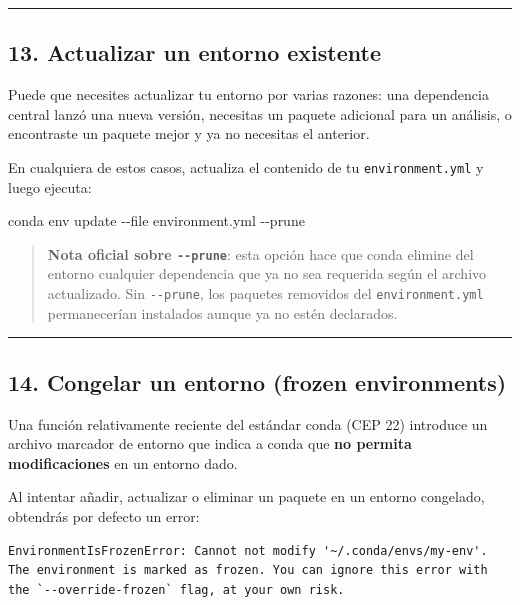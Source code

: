 \documentclass[
  doc,
  floatsintext,
  longtable,
  a4paper,
  nolmodern,
  notxfonts,
  notimes,
  12pt,
  colorlinks=true,linkcolor=blue,citecolor=blue,urlcolor=blue]{apa7}
\newenvironment{Shaded}{\begin{snugshade}}{\end{snugshade}}
\newcommand{\AttributeTok}[1]{\textcolor[rgb]{0.40,0.45,0.13}{#1}}
\newcommand{\ExtensionTok}[1]{\textcolor[rgb]{0.00,0.23,0.31}{#1}}
\newcommand{\NormalTok}[1]{\textcolor[rgb]{0.00,0.23,0.31}{#1}}
\begin{document}
\begin{center}\rule{0.5\linewidth}{0.5pt}\end{center}

\subsection{13. Actualizar un entorno
existente}\label{actualizar-un-entorno-existente}

Puede que necesites actualizar tu entorno por varias razones: una
dependencia central lanzó una nueva versión, necesitas un paquete
adicional para un análisis, o encontraste un paquete mejor y ya no
necesitas el anterior.

En cualquiera de estos casos, actualiza el contenido de tu
\texttt{environment.yml} y luego ejecuta:

\begin{Shaded}
\begin{Highlighting}[]
\ExtensionTok{conda}\NormalTok{ env update }\AttributeTok{{-}{-}file}\NormalTok{ environment.yml }\AttributeTok{{-}{-}prune}
\end{Highlighting}
\end{Shaded}

\begin{quote}
\textbf{Nota oficial sobre \texttt{-\/-prune}}: esta opción hace que
conda elimine del entorno cualquier dependencia que ya no sea requerida
según el archivo actualizado. Sin \texttt{-\/-prune}, los paquetes
removidos del \texttt{environment.yml} permanecerían instalados aunque
ya no estén declarados.
\end{quote}

\begin{center}\rule{0.5\linewidth}{0.5pt}\end{center}

\subsection{14. Congelar un entorno (frozen
environments)}\label{congelar-un-entorno-frozen-environments}

Una función relativamente reciente del estándar conda (CEP 22) introduce
un archivo marcador de entorno que indica a conda que \textbf{no permita
modificaciones} en un entorno dado.

Al intentar añadir, actualizar o eliminar un paquete en un entorno
congelado, obtendrás por defecto un error:

\begin{verbatim}
EnvironmentIsFrozenError: Cannot not modify '~/.conda/envs/my-env'.
The environment is marked as frozen. You can ignore this error with
the `--override-frozen` flag, at your own risk.
\end{verbatim}
\end{document}
